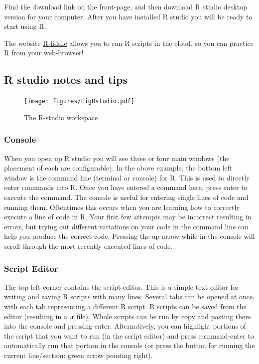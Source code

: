 \documentclass[
]{book}
\begin{document}
Find the download link on the front-page, and then download R studio desktop version for your computer. After you have installed R studio you will be ready to start using R.

The website \href{http://www.r-fiddle.org}{R-fiddle} allows you to run R scripts in the cloud, so you can practice R from your web-browser!

\hypertarget{r-studio-notes-and-tips}{%
\subsection{R studio notes and tips}\label{r-studio-notes-and-tips}}

\begin{figure}
\centering
\texttt{[image: figures/FigRstudio.pdf]}
\caption{\label{fig:2rstudiod}The R-studio workspace}
\end{figure}

\hypertarget{console}{%
\subsubsection{Console}\label{console}}

When you open up R studio you will see three or four main windows (the placement of each are configurable). In the above example, the bottom left window is the command line (terminal or console) for R. This is used to directly enter commands into R. Once you have entered a command here, press enter to execute the command. The console is useful for entering single lines of code and running them. Oftentimes this occurs when you are learning how to correctly execute a line of code in R. Your first few attempts may be incorrect resulting in errors, but trying out different variations on your code in the command line can help you produce the correct code. Pressing the up arrow while in the console will scroll through the most recently executed lines of code.

\hypertarget{script-editor}{%
\subsubsection{Script Editor}\label{script-editor}}

The top left corner contains the script editor. This is a simple text editor for writing and saving R scripts with many lines. Several tabs can be opened at once, with each tab representing a different R script. R scripts can be saved from the editor (resulting in a .r file). Whole scripts can be run by copy and pasting them into the console and pressing enter. Alternatively, you can highlight portions of the script that you want to run (in the script editor) and press command-enter to automatically run that portion in the console (or press the button for running the current line/section: green arrow pointing right).
\end{document}
